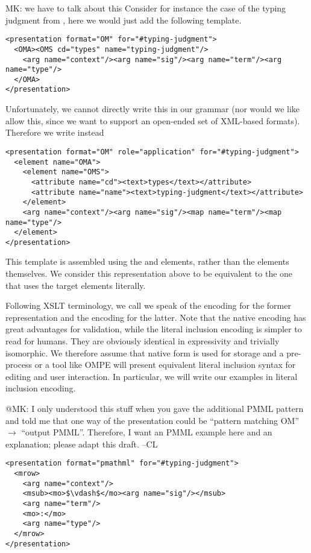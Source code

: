 \begin{newpart}{MK: we have to talk about this}
  Consider for instance the case of the typing judgment from {},
  here we would just add the following template. 
\begin{lstlisting}[mathescape]
<presentation format="OM" for="#typing-judgment">
  <OMA><OMS cd="types" name="typing-judgment"/>
    <arg name="context"/><arg name="sig"/><arg name="term"/><arg name="type"/>
  </OMA>
</presentation>
\end{lstlisting}
  Unfortunately, we cannot directly write this in our grammar (nor would we like allow
  this, since we want to support an open-ended set of XML-based formats). Therefore we
  write instead
\begin{lstlisting}[mathescape]
<presentation format="OM" role="application" for="#typing-judgment">
  <element name="OMA">
    <element name="OMS">
      <attribute name="cd"><text>types</text></attribute>
      <attribute name="name"><text>typing-judgment</text></attribute>
    </element>
    <arg name="context"/><arg name="sig"/><map name="term"/><map name="type"/>
  </element>
</presentation>
\end{lstlisting}
  This template is assembled using the {\omdoc} {} and
  {} elements, rather than the {\openmath} elements themselves. We
  consider this representation above to be equivalent to the one that uses the target
  elements literally.

  Following XSLT terminology, we call we speak of the {} encoding for the
  former representation and the {} encoding for the
  latter. Note that the native encoding has great advantages for validation, while the
  literal inclusion encoding is simpler to read for humans. They are obviously identical
  in expressivity and trivially isomorphic. We therefore assume that native form is used
  for storage and a pre-process or a tool like OMPE will present equivalent literal
  inclusion syntax for editing and user interaction. In particular, we will write our
  examples in literal inclusion encoding.

  \begin{newpart}{@MK: I only understood this stuff when you gave the additional PMML
      pattern and told me that one way of the presentation could be ``pattern matching
      OM'' $\to$ ``output PMML''. Therefore, I want an PMML example here and an
      explanation; please adapt this draft. --CL}
\begin{lstlisting}[mathescape]
<presentation format="pmathml" for="#typing-judgment">
  <mrow>
    <arg name="context"/>
    <msub><mo>$\vdash$</mo><arg name="sig"/></msub>
    <arg name="term"/>
    <mo>:</mo>
    <arg name="type"/>
  </mrow>
</presentation>
\end{lstlisting}
    

\end{newpart}
\end{newpart}
